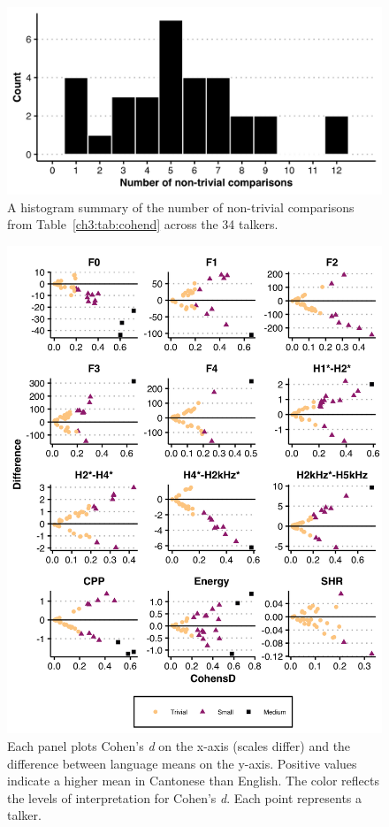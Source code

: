 \begin{figure}[htbp]
    \begin{center}
    \includegraphics[width=0.875\linewidth]{figures/ch3_nontrivial_counts_by_talker_5in.png} 
    \caption{A histogram summary of the number of non-trivial comparisons from Table~\ref{ch3:tab:cohend} across the 34 talkers.}
    \label{ch3:fig:ntcounts}
    \end{center}
\end{figure}

\begin{figure}[htbp] 
    \begin{center}
    \includegraphics[width=0.9\linewidth]{figures/ch3_cohend_part1_5in.png} 
    \caption{Each panel plots Cohen's \textit{d} on the x-axis (scales differ) and the difference between language means on the y-axis. Positive values indicate a higher mean in Cantonese than English. The color reflects the levels of interpretation for Cohen's \textit{d}. Each point represents a talker.}
    \label{ch3:fig:cohendmeasure}
    \end{center}
\end{figure}

